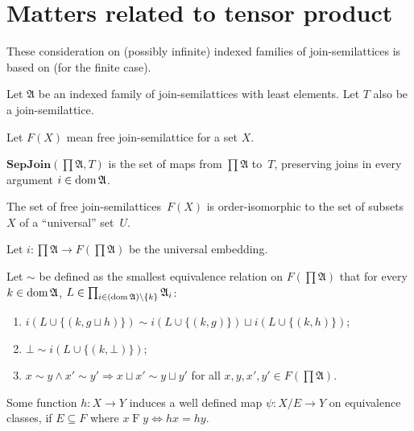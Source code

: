 \chapter{Matters related to tensor product}

These consideration on (possibly infinite) indexed families of
join-semilattices is based on \cite{nforum-todd-tensor} (for the finite case).

Let $\mathfrak{A}$ be an indexed family of join-semilattices with least
elements. Let $T$ also be a join-semilattice.

Let $F (X)$ mean free join-semilattice for a set $X$.

\begin{defn}
$\mathbf{SepJoin}(\prod\mathfrak{A},T)$ is the set of maps from $\prod\mathfrak{A}$
to~$T$, preserving joins in every argument $i\in\operatorname{dom}\mathfrak{A}$.
\end{defn}

\begin{obvious}
The set of free join-semilattices~$F(X)$ is order-isomorphic to the set of
subsets~$X$ of a ``universal'' set~$U$.
\end{obvious}

Let $i : \prod \mathfrak{A} \rightarrow F \left( \prod \mathfrak{A} \right)$
be the universal embedding.

Let $\sim$ be defined as the smallest equivalence relation on $F \left( \prod
\mathfrak{A} \right)$ that for every $k \in \operatorname{dom} \mathfrak{A}$, $L \in
\prod_{i \in (\operatorname{dom} \mathfrak{A}) \setminus \{ k \}} \mathfrak{A}_i$:
\begin{enumerate}
  \item $i (L \cup \{ (k , g \sqcup h) \}) \sim i (L \cup \{ (k , g) \})
  \sqcup i (L \cup \{ (k , h) \})$;
  
  \item $\bot \sim i (L \cup \{ (k , \bot) \})$;
  
  \item $x \sim y \wedge x' \sim y' \Rightarrow x \sqcup x' \sim y \sqcup y'$
  for all $x, y, x', y' \in F \left( \prod \mathfrak{A} \right)$.
\end{enumerate}

\begin{obvious}
Some function $h : X \rightarrow Y$ induces a well defined map $\psi : X / E
\rightarrow Y$ on equivalence classes, if $E \subseteq F$ where $x \mathrel{F}
y \Leftrightarrow h x = h y$.{\hspace*{\fill}}{\medskip}
\end{obvious}

